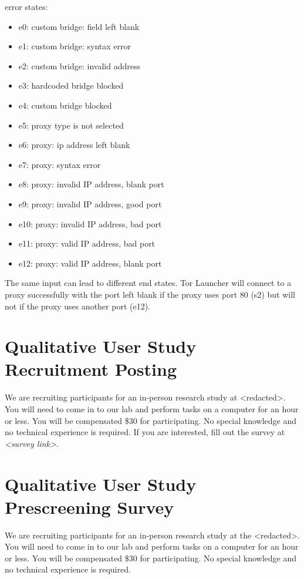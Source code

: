 \documentclass[USenglish,oneside,twocolumn]{article}
\begin{document}
error states:
\begin{itemize} 
\item e0: custom bridge: field left blank
\item e1: custom bridge: syntax error
\item e2: custom bridge: invalid address
\item e3: hardcoded bridge blocked
\item e4: custom bridge blocked
\item e5: proxy type is not selected
\item e6: proxy: ip address left blank
\item e7: proxy: syntax error
\item e8: proxy: invalid IP address, blank port
\item e9: proxy: invalid IP address, good port
\item e10: proxy: invalid IP address, bad port
\item e11: proxy: valid IP address, bad port
\item e12: proxy: valid IP address, blank port
\end{itemize} 

The same input can lead to different end states. Tor Launcher will connect to a proxy successfully with the port left blank if the proxy uses port 80 (s2) but will not if the proxy uses another port (e12). 

\section{Qualitative User Study Recruitment Posting} 
\label{qualitative-recruitment}
We are recruiting participants for an in-person research study at <redacted>. %
You will need to come in to our lab and perform tasks on a computer for an hour or less. You will be compensated \$30 for participating. 
No special knowledge and no technical experience is required. If you are interested, fill out the survey at \textit{<survey link>}. 

\section{Qualitative User Study Prescreening Survey} 
\label{qualitative-prescreening}
We are recruiting participants for an in-person research study at the <redacted>. %
You will need to come in to our lab and perform tasks on a computer for an hour or less. You will be compensated \$30 for participating. No special knowledge and no technical experience is required.\\
\end{document}
